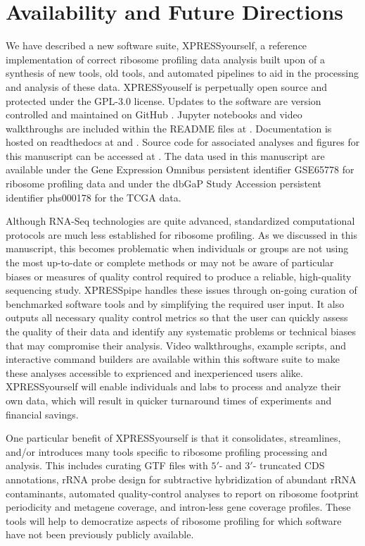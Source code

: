 \documentclass[10pt, oneside]{article}
\begin{document}
\section*{Availability and Future Directions}
We have described a new software suite, XPRESSyourself, a reference implementation of correct ribosome profiling data analysis built upon of a synthesis of new tools, old tools, and automated pipelines to aid in the processing and analysis of these data. XPRESSyouself is perpetually open source and protected under the GPL-3.0 license. Updates to the software are version controlled and maintained on GitHub \cite{xpressyourself}. Jupyter notebooks and video walkthroughs are included within the README files at \cite{xpressyourself}. Documentation is hosted on readthedocs \cite{readthedocs} at \cite{xpresspipe_docs} and \cite{xpressplot_docs}. Source code for associated analyses and figures for this manuscript can be accessed at \cite{manuscript}. The data used in this manuscript are available under the Gene Expression Omnibus persistent identifier GSE65778 \cite{isrib_geo} for ribosome profiling data and under the dbGaP Study Accession persistent identifier phs000178 \cite{tcga_data} for the TCGA data.\par

Although RNA-Seq technologies are quite advanced, standardized computational protocols are much less established for ribosome profiling. As we discussed in this manuscript, this becomes problematic when individuals or groups are not using the most up-to-date or complete methods or may not be aware of particular biases or measures of quality control required to produce a reliable, high-quality sequencing study. XPRESSpipe handles these issues through on-going curation of benchmarked software tools and by simplifying the required user input. It also outputs all necessary quality control metrics so that the user can quickly assess the quality of their data and identify any systematic problems or technical biases that may compromise their analysis. Video walkthroughs, example scripts, and interactive command builders are available within this software suite to make these analyses accessible to exprienced and inexperienced users alike. XPRESSyourself will enable individuals and labs to process and analyze their own data, which will result in quicker turnaround times of experiments and financial savings.\par

One particular benefit of XPRESSyourself is that it consolidates, streamlines, and/or introduces many tools specific to ribosome profiling processing and analysis. This includes curating GTF files with $5'$- and $3'$- truncated CDS annotations, rRNA probe design for subtractive hybridization of abundant rRNA contaminants, automated quality-control analyses to report on ribosome footprint periodicity and metagene coverage, and intron-less gene coverage profiles. These tools will help to democratize aspects of ribosome profiling for which software have not been previously publicly available.\par
\end{document}
